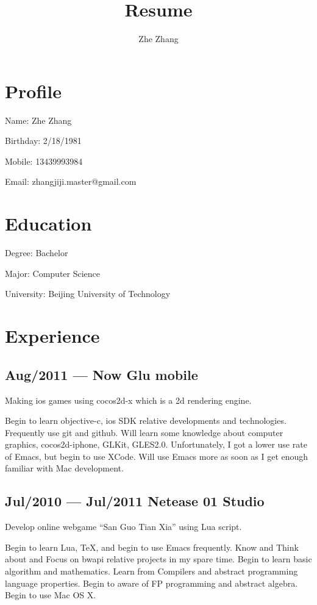 \documentclass{article}
\begin{document}
\title{Resume}
\author{Zhe Zhang}

\maketitle

\newpage

\section*{Profile}

Name: Zhe Zhang

Birthday: 2/18/1981

Mobile: 13439993984

Email: zhangjiji.master@gmail.com

\section*{Education}

Degree: Bachelor

Major: Computer Science

University: Beijing University of Technology

\section*{Experience}

\subsection*{Aug/2011 --- Now \quad Glu mobile}

Making ios games using cocos2d-x which is a 2d rendering engine.

Begin to learn objective-c, ios SDK relative developments and technologies. Frequently use git and github. Will learn some knowledge about computer graphics, cocos2d-iphone, GLKit, GLES2.0. Unfortunately, I got a lower use rate of Emacs, but begin to use XCode. Will use Emacs more as soon as I get enough familiar with Mac development.

\subsection*{Jul/2010 --- Jul/2011 \quad Netease 01 Studio}

Develop online webgame ``San Guo Tian Xia'' using Lua script.

Begin to learn Lua, {\TeX}, and begin to use Emacs frequently. Know and Think about and Focus on bwapi relative projects in my spare time. Begin to learn basic algorithm and mathematics. Learn from Compilers and abstract programming language properties. Begin to aware of FP programming and abstract algebra. Begin to use Mac OS X.
\end{document}
